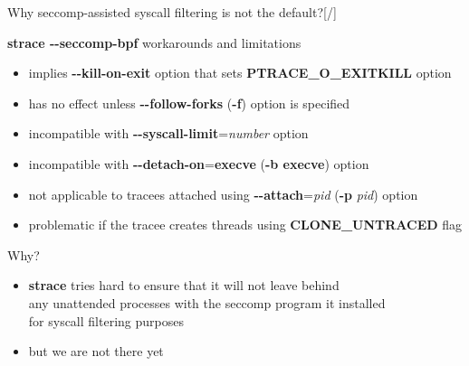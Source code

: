 \documentclass[unicode,aspectratio=169,xcolor={table,dvipsnames,usernames}]{beamer}
\begin{document}
\begin{frame}{\Large Why seccomp-assisted syscall filtering is not the default?\hfill [\insertframenumber/\inserttotalframenumber]}
\large
\begin{block}{\textbf{strace -{}-seccomp-bpf} workarounds and limitations}
\begin{itemize}
	\item implies \textbf{-{}-kill-on-exit} option that sets \textbf{PTRACE\_O\_EXITKILL} option
	\item has no effect unless \textbf{-{}-follow-forks} (\textbf{-f}) option is specified
	\item incompatible with \textbf{-{}-syscall-limit}=\textit{number} option
	\item incompatible with \textbf{-{}-detach-on}=\textbf{execve} (\textbf{-b execve}) option
	\item not applicable to tracees attached using \textbf{-{}-attach}=\textit{pid} (\textbf{-p} \textit{pid}) option
	\item problematic if the tracee creates threads using \textbf{CLONE\_UNTRACED} flag
\end{itemize}
\end{block}

\begin{block}{Why?}
\begin{itemize}
	\item \textbf{strace} tries hard to ensure that it will not leave behind \\
		any unattended processes with the seccomp program it installed \\
		for syscall filtering purposes
	\item but we are not there yet
\end{itemize}
\end{block}
\end{frame}
\end{document}

